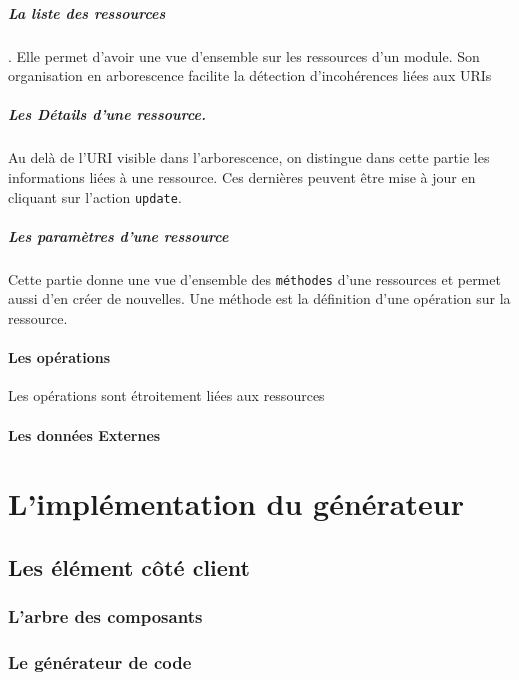 \documentclass[a4paper,11pt]{report}
\begin{document}
 \paragraph{La liste des ressources}.
Elle permet d'avoir une vue d'ensemble sur les ressources d'un module.
Son organisation en arborescence facilite la détection d'incohérences
liées aux URIs
\paragraph{Les Détails d'une ressource.}
Au delà de l'URI visible dans l'arborescence, on distingue dans  cette
partie les informations liées à une ressource. Ces dernières peuvent
être mise à jour en cliquant sur l'action {\tt update}.

\paragraph{Les paramètres d'une ressource}
Cette partie donne une vue d'ensemble des {\tt méthodes} d'une
ressources et permet aussi d'en créer de nouvelles. Une méthode est la
définition d'une opération sur la ressource.

\subsubsection{Les opérations}
Les opérations sont étroitement liées aux ressources

\subsubsection{Les données Externes}%


 


\chapter{L'implémentation du générateur }
\section {Les élément côté client}
\subsection{L'arbre des composants}
\subsection{Le générateur de code}
\end{document}
